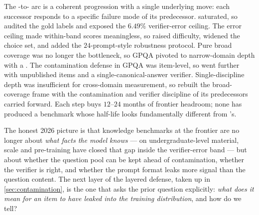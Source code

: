The -to- arc is a coherent progression with a single underlying
move: each successor responds to a specific failure mode of its
predecessor.  saturated, so  audited the gold labels
and exposed the $6.49\%$ verifier-error ceiling. The error ceiling
made within-band scores meaningless, so  raised difficulty,
widened the choice set, and added the $24$-prompt-style robustness
protocol. Pure broad coverage was no longer the bottleneck, so GPQA
pivoted to narrow-domain depth with a . The
contamination defense in GPQA was item-level, so  went
further with unpublished items and a single-canonical-answer verifier.
Single-discipline depth was insufficient for cross-domain measurement,
so  rebuilt the broad-coverage frame with the contamination and
verifier discipline of its predecessors carried forward. Each step
buys $12$--$24$ months of frontier headroom; none has produced a
benchmark whose half-life looks fundamentally different from 's.

The honest 2026 picture is that knowledge benchmarks at the frontier
are no longer about \emph{what facts the model knows} --- on
undergraduate-level material, scale and pre-training have closed
that gap inside the verifier-error band --- but about whether the
question pool can be kept ahead of contamination, whether the verifier
is right, and whether the prompt format leaks more signal than the
question content. The next layer of the layered defense, taken up in
\cref{sec:contamination}, is the one that asks the prior question
explicitly: \emph{what does it mean for an item to have leaked into
the training distribution}, and how do we tell?
